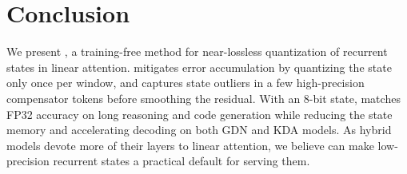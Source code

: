 \vspace{-0.75em}
\section{Conclusion}
\label{sec:conclusion}

We present \method{}, a training-free method for near-lossless quantization of recurrent states in linear attention.
\sys{} mitigates error accumulation by quantizing the state only once per window, and captures state outliers in a few high-precision compensator tokens before smoothing the residual.
With an 8-bit state, \method{} matches FP32 accuracy on long reasoning and code generation while reducing the state memory and accelerating decoding on both GDN and KDA models.
As hybrid models devote more of their layers to linear
attention, we believe \method{} can make low-precision recurrent states a practical default for serving them.